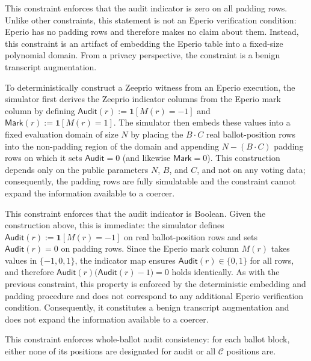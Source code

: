 
This constraint enforces that the audit indicator is zero on all padding rows. Unlike other constraints, this statement is not an Eperio verification condition: Eperio has no padding rows and therefore makes no claim about them. Instead, this constraint is an artifact of embedding the Eperio table into a fixed-size polynomial domain. From a privacy perspective, the constraint is a benign transcript augmentation. 

To deterministically construct a Zeeprio witness from an Eperio execution, the simulator first derives the Zeeprio indicator columns from the Eperio mark column by defining $\mathsf{Audit}(r):=\mathbf{1}[M(r)=-1]$ and $\mathsf{Mark}(r):=\mathbf{1}[M(r)=1]$. The simulator then embeds these values into a fixed evaluation domain of size $N$ by placing the $B\cdot C$ real ballot-position rows into the non-padding region of the domain and appending $N-(B\cdot C)$ padding rows on which it sets $\mathsf{Audit}=0$ (and likewise $\mathsf{Mark}=0$). This construction depends only on the public parameters $N$, $B$, and $C$, and not on any voting data; consequently, the padding rows are fully simulatable and the constraint cannot expand the information available to a coercer.


This constraint enforces that the audit indicator is Boolean. Given the construction above, this is immediate: the simulator defines $\mathsf{Audit}(r):=\mathbf{1}[M(r)=-1]$ on real ballot-position rows and sets $\mathsf{Audit}(r)=0$ on padding rows. Since the Eperio mark column $M(r)$ takes values in $\{-1,0,1\}$, the indicator map ensures $\mathsf{Audit}(r)\in\{0,1\}$ for all rows, and therefore $\mathsf{Audit}(r)\bigl(\mathsf{Audit}(r)-1\bigr)=0$ holds identically. As with the previous constraint, this property is enforced by the deterministic embedding and padding procedure and does not correspond to any additional Eperio verification condition. Consequently, it constitutes a benign transcript augmentation and does not expand the information available to a coercer.


This constraint enforces whole-ballot audit consistency: for each ballot block, either none of its positions are designated for audit or all $\mathcal{C}$ positions are. 

